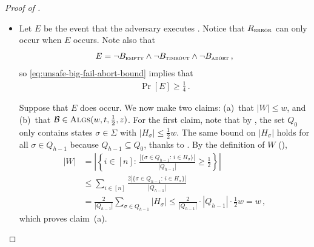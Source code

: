 \documentclass[10pt,a4paper]{article}
\theoremstyle{definition}
\theoremstyle{remark}
\newcommand{\cB}{\mathcal{B}}
\newcommand{\Algs}{\textsc{Algs}\xspace}
\newcommand{\emptysc}{\textsc{empty}\xspace}
\newcommand{\timeoutsc}{\textsc{timeout}\xspace}
\newcommand{\abort}{\textsc{abort}\xspace}
\newcommand{\errorsc}{\textsc{error}\xspace}
\begin{document}
\begin{itemize}
\begin{itemize}
\begin{proof}[Proof of ]
\begin{itemize}
\begin{itemize}[wide, font=\bfseries]
  \item[(Event $R_{\errorsc}$)~]
    Let $E$ be the event that the adversary executes
    . Notice that $R_{\errorsc}$ can only occur when
    $E$ occurs. Note also that
    \[
      E = \neg B_{\emptysc} \land \neg B_{\timeoutsc} \land \neg B_{\abort} \,,
    \]
    so
    \cref{eq:unsafe-big-fail-abort-bound} implies that 
    \begin{align}
      \Pr[E] \ge \frac14 \,.
      \label{eq:e-bound}
    \end{align}

    Suppose that $E$ does occur. We now make two claims: (a)~that $|W| \le w$,
    and (b)~that $\cB \in \Algs(w,t,\frac12,z)$. For the first claim, note
    that by , the set $Q_0$ only contains states $\sigma
    \in \Sigma$ with $|H_\sigma| \le \frac{1}{2} w$. The same bound on
    $|H_\sigma|$ holds for all $\sigma \in Q_{h-1}$ because $Q_{h-1} \subseteq
    Q_0$, thanks to .  By the definition of $W$
    (),
    \begin{align*}
      |W| 
      &= \left|\left\{i \in [n] :\, 
        \frac{|\{\sigma \in Q_{h-1} :\, i \in H_\sigma \}|}{|Q_{h-1}|} 
        \ge \frac{1}{2} \right\}\right| \\
      &\le \sum_{i \in [n]} \frac{2 |\{\sigma \in Q_{h-1} :\, i \in H_\sigma \}|}{|Q_{h-1}|} \\
      &= \frac{2}{|Q_{h-1}|} \sum_{\sigma \in Q_{h-1}} |H_\sigma|
      \le \frac{2}{|Q_{h-1}|} \cdot |Q_{h-1}| \cdot \frac{1}{2} w 
      = w \,,
    \end{align*}
    which proves claim~(a).
  

\end{itemize}
\end{itemize}
\end{proof}
\end{itemize}
\end{itemize}
\end{document}
